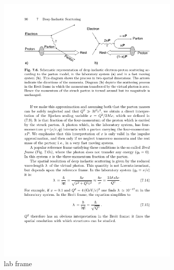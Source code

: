 \begin{figure}[H]
    \centering
    \begin{subfigure}{0.48\linewidth}
        \includegraphics[width=\linewidth]{img/lab_sys.pdf}
        \caption{lab frame}
        \label{fig:eic:dis_kin::lab}
    \end{subfigure}
    \begin{subfigure}{0.48\linewidth}

\end{subfigure}
\end{figure}
